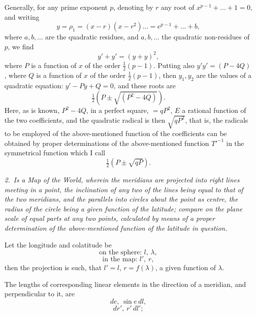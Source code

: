 \documentclass[11pt,a4paper]{article}
\theoremstyle{plain}
\theoremstyle{definition}
\begin{document}
Generally, for any prime exponent $p$, denoting by $r$ any root of $x^{p-1} + \ldots + 1 = 0$,
and writing
\[
y = \rho_1 = (x - r)(x - r^2) \ldots = e^{p - 1} + \ldots + b,
\]
where $a, b, \ldots$ are the quadratic residues, and $a, b, \ldots$ the quadratic non-residues of
$p$, we find
\[
y' + y' = (y + y)^2,
\]
where $P$ is a function of $x$ of the order $\frac{1}{2}(p - 1)$. Putting also $y' y' = (P - 4Q)$,
where $Q$ is a function of $x$ of the order $\frac{1}{2}(p - 1)$, then $y_1, y_2$ are the values
of a quadratic equation: $y' - P y + Q = 0$, and these roots are
\[
\tfrac{1}{2} (P \pm \sqrt{(P^2 - 4 Q)}).
\]
Here, as is known, $P^2 - 4 Q$, in a perfect square, $= q P^2$, $E$ a rational function of the
two coefficients, and the quadratic radical is then $\sqrt{q P^2}$, that is, the radicals to be employed
of the above-mentioned function of the coefficients can be obtained by proper determinations of
the above-mentioned function $T'^{-1}$ in the symmetrical function which I call
\[
\tfrac{1}{2} (P \pm \sqrt{q P}).
\]

\textit{2.\ Is a Map of the World, wherein the meridians are projected into right lines
meeting in a point, the inclination of any two of the lines being equal to that of the
two meridians, and the parallels into circles about the point as centre, the radius of
the circle being a given function of the latitude; compare on the plane scale of equal
parts at any two points, calculated by means of a proper determination of
the above-mentioned function of the latitude in question.}

Let the longitude and colatitude be
\[
\text{on the sphere: }l,\ \lambda,
\]
\[
\text{in the map: }l',\ r,
\]
then the projection is such, that $l' = l$, $r = f(\lambda)$, a given function of $\lambda$.

The lengths of corresponding linear elements in the direction of a meridian, and
perpendicular to it, are
\[
de,\ \sin e\,dl,
\]
\[
dr',\ r'\,dl';
\]
\end{document}
